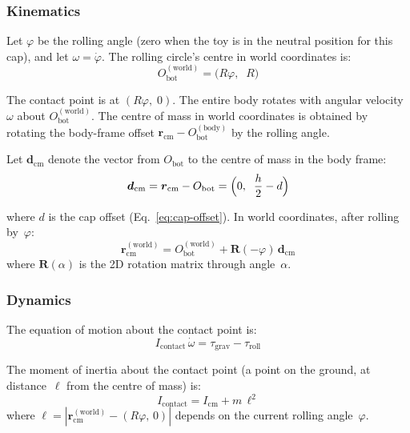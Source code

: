 \documentclass[11pt,a4paper]{article}
\newcommand{\vect}[1]{\boldsymbol{#1}}
\newcommand{\mat}[1]{\mathbf{#1}}
\newcommand{\abs}[1]{\left| #1 \right|}
\newcommand{\eqn}[1]{Eq.~\eqref{#1}}
\newcommand{\cm}{\mathrm{cm}}
\theoremstyle{plain}
\theoremstyle{definition}
\theoremstyle{remark}
\begin{document}
\subsubsection{Kinematics}

Let $\varphi$ be the rolling angle (zero when the toy is in the neutral position for this cap), and let $\omega = \dot{\varphi}$.  The rolling circle's centre in world coordinates is:
\begin{equation}
    O_{\mathrm{bot}}^{(\mathrm{world})} = \bigl(R\varphi,\;\; R\bigr)
    \label{eq:circle-center-world}
\end{equation}

The contact point is at $(R\varphi,\; 0)$.  The entire body rotates with angular velocity~$\omega$ about $O_{\mathrm{bot}}^{(\mathrm{world})}$.  The centre of mass in world coordinates is obtained by rotating the body-frame offset $\vect{r}_{\cm} - O_{\mathrm{bot}}^{(\mathrm{body})}$ by the rolling angle.

Let $\vect{d}_{\cm}$ denote the vector from $O_{\mathrm{bot}}$ to the centre of mass in the body frame:
\begin{equation}
    \vect{d}_{\cm} = \vect{r}_{\cm} - O_{\mathrm{bot}} = \Bigl(0,\;\; \frac{h}{2} - d\Bigr)
    \label{eq:dcm}
\end{equation}

where $d$ is the cap offset (\eqn{eq:cap-offset}).  In world coordinates, after rolling by~$\varphi$:
\begin{equation}
    \vect{r}_{\cm}^{(\mathrm{world})} = O_{\mathrm{bot}}^{(\mathrm{world})} + \mat{R}(-\varphi)\,\vect{d}_{\cm}
    \label{eq:com-world}
\end{equation}
where $\mat{R}(\alpha)$ is the 2D rotation matrix through angle~$\alpha$.

\subsubsection{Dynamics}

The equation of motion about the contact point is:
\begin{equation}
    I_{\mathrm{contact}}\,\dot{\omega} = \tau_{\mathrm{grav}} - \tau_{\mathrm{roll}}
    \label{eq:eom-rolling}
\end{equation}

The moment of inertia about the contact point (a point on the ground, at distance~$\ell$ from the centre of mass) is:
\begin{equation}
    I_{\mathrm{contact}} = I_{\cm} + m\,\ell^2
    \label{eq:I-contact}
\end{equation}
where $\ell = \abs{\vect{r}_{\cm}^{(\mathrm{world})} - (R\varphi,\, 0)}$ depends on the current rolling angle~$\varphi$.
\end{document}
